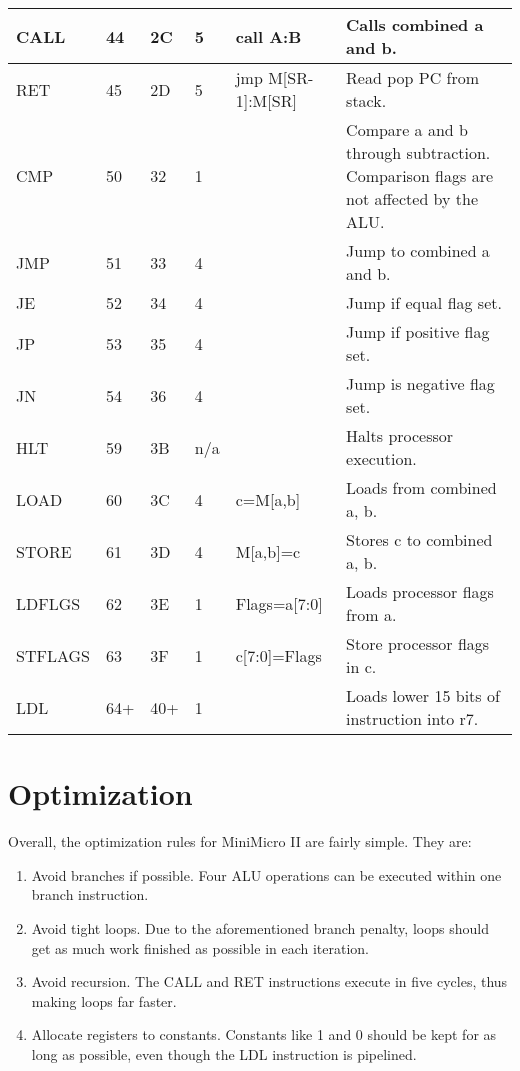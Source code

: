 \documentclass[12pt,letterpaper]{article}
\begin{document}
\begin{longtable}{l|l|l|l|p{2cm}|p{3cm}}
  CALL & 44 & 2C & 5 & call A:B & Calls combined a and b. \\
  \hline
  RET & 45 & 2D & 5 & jmp M[SR-1]:M[SR] & Read pop PC from stack. \\
  \hline
  CMP & 50 & 32 & 1 & & Compare a and b through subtraction. Comparison flags are not affected by the ALU.\\
  \hline
  JMP & 51 & 33 & 4 & & Jump to combined a and b.\\
  \hline
  JE & 52 & 34 & 4 & & Jump if equal flag set.\\
  \hline
  JP & 53 & 35 & 4 & & Jump if positive flag set.\\
  \hline
  JN & 54 & 36 & 4 & & Jump is negative flag set.\\
  \hline
  HLT & 59 & 3B & n/a & & Halts processor execution.\\
  \hline
  LOAD & 60 & 3C & 4 & c=M[a,b] & Loads from combined a, b.\\
  \hline
  STORE & 61 & 3D & 4 & M[a,b]=c & Stores c to combined a, b.\\
  \hline
  LDFLGS & 62 & 3E & 1 & Flags=a[7:0] & Loads processor flags from a.\\
  \hline
  STFLAGS & 63 & 3F & 1 & c[7:0]=Flags & Store processor flags in c.\\
  \hline
  LDL & 64+ & 40+ & 1 & & Loads lower 15 bits of instruction into r7.\\
  \hline
\end{longtable}

\section{Optimization}
Overall, the optimization rules for MiniMicro II are fairly simple. They are:

\begin{enumerate}
  \item Avoid branches if possible. Four ALU operations can be executed within one branch instruction.
  \item Avoid tight loops. Due to the aforementioned branch penalty, loops should get as much work finished as possible in each iteration.
  \item Avoid recursion. The CALL and RET instructions execute in five cycles, thus making loops far faster.
  \item Allocate registers to constants. Constants like 1 and 0 should be kept for as long as possible, even though the LDL instruction is pipelined. 
\end{enumerate}
\end{document}
